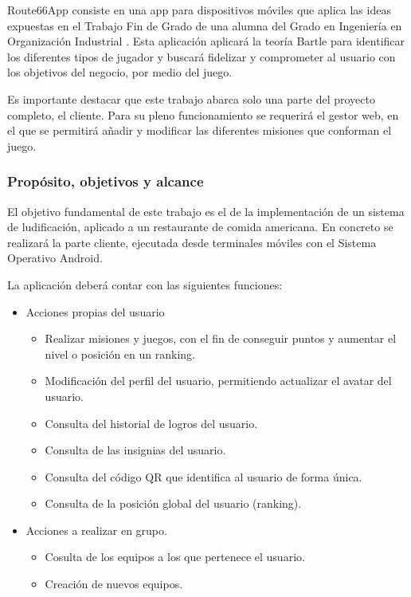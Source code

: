 \documentclass[twoside]{report}
\begin{document}
Route66App consiste en una app para dispositivos móviles que aplica las ideas expuestas en el Trabajo Fin de Grado de una alumna del Grado en Ingeniería en Organización Industrial \cite{cristinatfg}. Esta aplicación aplicará la teoría Bartle\cite{iebsctj} para identificar los diferentes tipos de jugador y buscará fidelizar y comprometer al usuario con los objetivos del negocio, por medio del juego.

Es importante destacar que este trabajo abarca solo una parte del proyecto completo, el cliente. Para su pleno funcionamiento se requerirá el gestor web, en el que se permitirá añadir y modificar las diferentes misiones que conforman el juego. 
 
\subsubsection{Propósito, objetivos y alcance}

El objetivo fundamental de  este trabajo es el de la implementación de un sistema de ludificación, aplicado a un restaurante de comida americana. En concreto se realizará la parte cliente, ejecutada desde terminales móviles con el Sistema Operativo Android.

La aplicación deberá contar con las siguientes funciones:
\begin{itemize}
\item Acciones propias del usuario
	\begin{itemize}
	\item Realizar misiones y juegos, con el fin de conseguir puntos y aumentar el nivel o posición en un ranking.
	\item Modificación del perfil del usuario, permitiendo actualizar el avatar del usuario.
	\item Consulta del historial de logros del usuario.
	\item Consulta de las insignias del usuario.
	\item Consulta del código QR que identifica al usuario de forma única.
	\item Consulta de la posición global del usuario (ranking).
	\end{itemize}
\item Acciones a realizar en grupo.
	\begin{itemize}
	\item Cosulta de los equipos a los que pertenece el usuario.
	\item Creación de nuevos equipos.
	\end{itemize}
\end{itemize}
\end{document}
